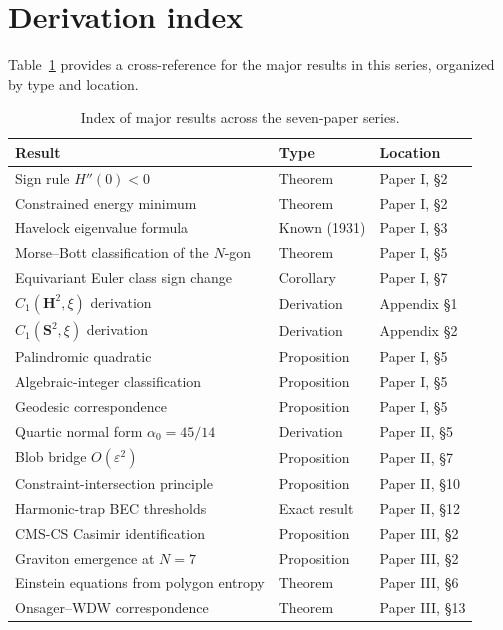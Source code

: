 \section{Derivation index}
\label{app:derivation-index}

Table~\ref{tab:derivation-index} provides a cross-reference for the
major results in this series, organized by type and location.

\begin{table}[ht]
\centering\small
\caption{Index of major results across the seven-paper series.}
\label{tab:derivation-index}
\begin{tabular}{@{}lll@{}}
\toprule
Result & Type & Location \\
\midrule
Sign rule $H''(0) < 0$ & Theorem & Paper I, \S 2 \\
Constrained energy minimum & Theorem & Paper I, \S 2 \\
Havelock eigenvalue formula & Known (1931) & Paper I, \S 3 \\
Morse--Bott classification of the $N$-gon & Theorem & Paper I, \S 5 \\
Equivariant Euler class sign change & Corollary & Paper I, \S 7 \\
$C_1(\mathbf{H}^2,\xi)$ derivation & Derivation & Appendix \S 1 \\
$C_1(\mathbf{S}^2,\xi)$ derivation & Derivation & Appendix \S 2 \\
Palindromic quadratic & Proposition & Paper I, \S 5 \\
Algebraic-integer classification & Proposition & Paper I, \S 5 \\
Geodesic correspondence & Proposition & Paper I, \S 5 \\
Quartic normal form $\alpha_0 = 45/14$ & Derivation & Paper II, \S 5 \\
Blob bridge $O(\varepsilon^2)$ & Proposition & Paper II, \S 7 \\
Constraint-intersection principle & Proposition & Paper II, \S 10 \\
Harmonic-trap BEC thresholds & Exact result & Paper II, \S 12 \\
CMS-CS Casimir identification & Proposition & Paper III, \S 2 \\
Graviton emergence at $N=7$ & Proposition & Paper III, \S 2 \\
Einstein equations from polygon entropy & Theorem & Paper III, \S 6 \\
Onsager--WDW correspondence & Theorem & Paper III, \S 13 \\

\end{tabular}
\end{table}
